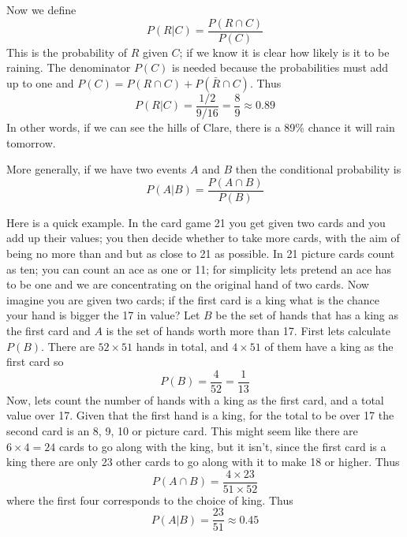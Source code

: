 \documentclass[11pt,a4paper]{scrartcl}
\begin{document}
Now we define
\begin{equation}
P(R|C)=\frac{P(R\cap C)}{P(C)} 
\end{equation}
This is the probability of $R$ given $C$; if we know it is clear how
likely is it to be raining. The denominator $P(C)$ is needed because
the probabilities must add up to one and $P(C)=P(R\cap C)+P(\bar{R}\cap C)$. Thus
\begin{equation}
P(R|C)=\frac{1/2}{9/16}=\frac{8}{9}\approx  0.89
\end{equation}
In other words, if we can see the hills of Clare, there is a 89\%
chance it will rain tomorrow.

More generally, if we have two events $A$ and $B$ then the conditional probability is
\begin{equation}
P(A|B)=\frac{P(A\cap B)}{P(B)}
\end{equation}

Here is a quick example. In the card game 21 you get given two cards
and you add up their values; you then decide whether to take more
cards, with the aim of being no more than and but as close to 21 as
possible. In 21 picture cards count as ten; you can count an ace as
one or 11; for simplicity lets pretend an ace has to be one and we are
concentrating on the original hand of two cards. Now imagine you are
given two cards; if the first card is a king what is the chance your
hand is bigger the 17 in value? Let $B$ be the set of hands that has a
king as the first card and $A$ is the set of hands worth more than
17. First lets calculate $P(B)$. There are $52\times 51$ hands in
total, and $4\times 51$ of them have a king as the first card so
\begin{equation}
P(B)=\frac{4}{52}=\frac{1}{13}
\end{equation}
Now, lets count the number of hands with a king as the first card, and
a total value over 17. Given that the first hand is a king, for the
total to be over 17 the second card is an 8, 9, 10 or picture
card. This might seem like there are $6\times 4=24$ cards to go along
with the king, but it isn't, since the first card is a king there are
only 23 other cards to go along with it to make 18 or higher. Thus
\begin{equation}
P(A\cap B)=\frac{4\times 23}{51\times 52}
\end{equation}
where the first four corresponds to the choice of king. Thus
\begin{equation}
P(A|B)=\frac{23}{51}\approx 0.45
\end{equation}
\end{document}
